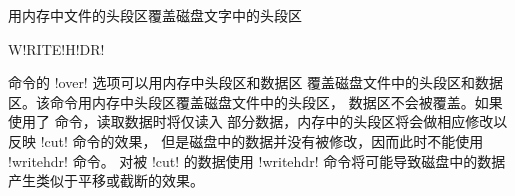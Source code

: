 \label{cmd:writehdr}

用内存中文件的头段区覆盖磁盘文字中的头段区

\begin{SACSTX}
W!RITE!H!DR!
\end{SACSTX}

 命令的 !over! 选项可以用内存中头段区和数据区
覆盖磁盘文件中的头段区和数据区。该命令用内存中头段区覆盖磁盘文件中的头段区，
数据区不会被覆盖。如果使用了  命令，读取数据时将仅读入
部分数据，内存中的头段区将会做相应修改以反映 !cut! 命令的效果，
但是磁盘中的数据并没有被修改，因而此时不能使用 !writehdr! 命令。
对被 !cut! 的数据使用 !writehdr! 命令将可能导致磁盘中的数据
产生类似于平移或截断的效果。
